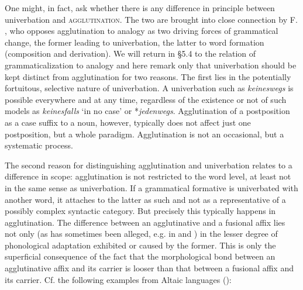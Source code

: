 One might, in fact, ask whether there is any difference in principle between univerbation and \textsc{agglutination}. The two are brought into close connection by F. \citet[Part 3, Ch. VII, §§1f]{Saussure1916}, who opposes agglutination to analogy as two driving forces of grammatical change, the former leading to univerbation, the latter to word formation (composition and derivation). We will return in §5.4 to the relation of grammaticalization to analogy and here remark only that univerbation should be kept distinct from agglutination for two reasons. The first lies in the potentially fortuitous, selective nature of univerbation. A univerbation such as \textit{keineswegs} is possible everywhere and at any time, regardless of the existence or not of such models as \textit{keinesfalls} ‘in no case’ or *\textit{jedenwegs}. Agglutination of a postposition as a case suffix to a noun, however, typically does not affect just one postposition, but a whole paradigm. Agglutination is not an occasional, but a systematic process.

The second reason for distinguishing agglutination and univerbation relates to a difference in scope: agglutination is not restricted to the word level, at least not in the same sense as univerbation. If a grammatical formative is univerbated with another word, it attaches to the latter as such and not as a representative of a possibly complex syntactic category. But precisely this typically happens in agglutination. The difference between an agglutinative and a fusional affix lies not only (as has sometimes been alleged, e.g. in \citealt[Ch.~V]{Sapir1921} and \citealt{Greenberg1954}) in the lesser degree of phonological adaptation exhibited or caused by the former. This is only the superficial consequence of the fact that the morphological bond between an agglutinative affix and its carrier is looser than that between a fusional affix and its carrier. Cf. the following examples from Altaic languages (\citealt[71]{Žirmunskij1966}):

